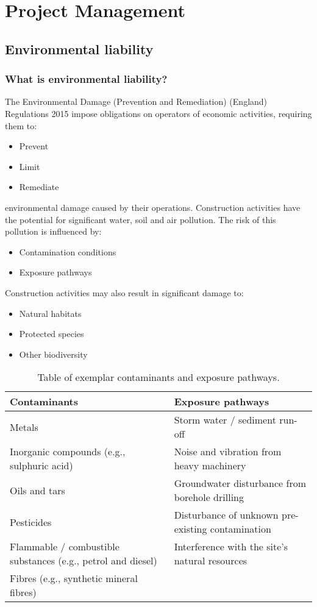 \chapter{Project Management}
\section{Environmental liability}
\subsection{What is environmental liability?}
The Environmental Damage (Prevention and Remediation) (England) Regulations 2015 impose obligations on operators of economic activities, requiring them to:
\begin{itemize}
    \item Prevent
    \item Limit
    \item Remediate
\end{itemize}
environmental damage caused by their operations. Construction activities have the potential for significant water, soil and air pollution. The risk of this pollution is influenced by:
\begin{itemize}
    \item Contamination conditions
    \item Exposure pathways
\end{itemize}
Construction activities may also result in significant damage to:
\begin{itemize}
    \item Natural habitats
    \item Protected species
    \item Other biodiversity
\end{itemize}
\begin{table}[H]
    \centering
    \begin{tabular}{@{}ll@{}}
        \toprule
        \textbf{Contaminants}                                        & \textbf{Exposure pathways}                        \\
        \midrule
        Metals                                                       & Storm water / sediment run-off                    \\
        Inorganic compounds (e.g., sulphuric acid)                   & Noise and vibration from heavy machinery          \\
        Oils and tars                                                & Groundwater disturbance from borehole drilling    \\
        Pesticides                                                   & Disturbance of unknown pre-existing contamination \\
        Flammable / combustible substances (e.g., petrol and diesel) & Interference with the site's natural resources    \\
        Fibres (e.g., synthetic mineral fibres)                      &                                                   \\
        \bottomrule
    \end{tabular}
    \caption{Table of exemplar contaminants and exposure pathways.}
\end{table}
